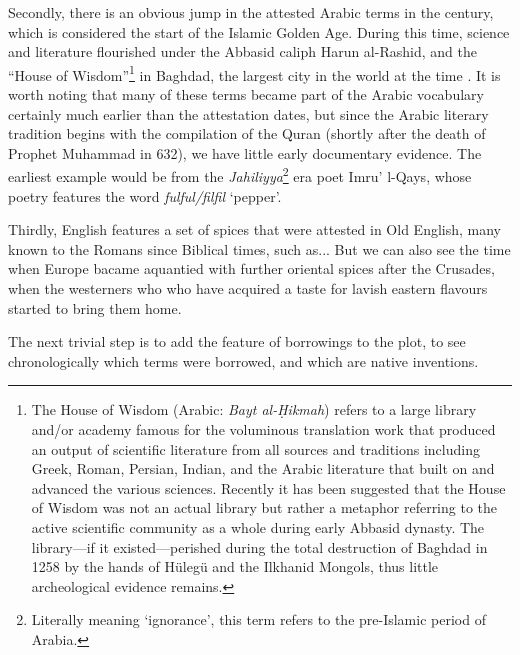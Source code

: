 Secondly, there is an obvious jump in the attested Arabic terms in the  century, which is considered the start of the Islamic Golden Age. During this time, science and literature flourished under the Abbasid caliph Harun al-Rashid, and the ``House of Wisdom''\footnote{The House of Wisdom (Arabic: \textit{Bayt al-Ḥikmah}) refers to a large library and/or academy famous for the voluminous translation work that produced an output of scientific literature from all sources and traditions including Greek, Roman, Persian, Indian, and the Arabic literature that built on and advanced the various sciences. Recently it has been suggested that the House of Wisdom was not an actual library but rather a metaphor referring to the active scientific community as a whole during early Abbasid dynasty. The library---if it existed---perished during the total destruction of Baghdad in 1258 by the hands of Hülegü and the Ilkhanid Mongols, thus little archeological evidence remains.} in Baghdad, the largest city in the world at the time \autocite{gutas_greek_1998}. It is worth noting that many of these terms became part of the Arabic vocabulary certainly much earlier than the attestation dates, but since the Arabic literary tradition begins with the compilation of the Quran (shortly after the death of Prophet Muhammad in 632), we have little early documentary evidence. The earliest example would be from the \textit{Jahiliyya}\footnote{Literally meaning `ignorance', this term refers to the pre-Islamic period of Arabia.} era poet Imru' l-Qays, whose poetry features the word \textit{fulful/filfil} `pepper'.

Thirdly, English features a set of spices that were attested in Old English, many known to the Romans since Biblical times, such as...
But we can also see the time when Europe bacame aquantied with further oriental spices after the Crusades, when the westerners who who have acquired a taste for lavish eastern flavours started to bring them home.

The next trivial step is to add the feature of borrowings to the plot, to see chronologically which terms were borrowed, and which are native inventions. 



